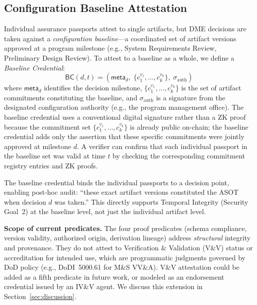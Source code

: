\subsection{Configuration Baseline Attestation}
\label{sec:fw-baseline}

Individual assurance passports attest to single artifacts, but DME decisions are taken against a \emph{configuration baseline}---a coordinated set of artifact versions approved at a program milestone (e.g., System Requirements Review, Preliminary Design Review).
To attest to a baseline as a whole, we define a \emph{Baseline Credential}:
\begin{equation}
\label{eq:baseline}
\mathsf{BC}(d, t) = \left(\mathsf{meta}_d,\; \{c_1^{v_1}, \ldots, c_k^{v_k}\},\; \sigma_{\text{auth}}\right)
\end{equation}
where $\mathsf{meta}_d$ identifies the decision milestone, $\{c_1^{v_1}, \ldots, c_k^{v_k}\}$ is the set of artifact commitments constituting the baseline, and $\sigma_{\text{auth}}$ is a signature from the designated configuration authority (e.g., the program management office).
The baseline credential uses a conventional digital signature rather than a ZK proof because the commitment set $\{c_1^{v_1}, \ldots, c_k^{v_k}\}$ is already public on-chain; the baseline credential adds only the assertion that these specific commitments were jointly approved at milestone $d$.
A verifier can confirm that each individual passport in the baseline set was valid at time $t$ by checking the corresponding commitment registry entries and ZK proofs.

The baseline credential binds the individual passports to a decision point, enabling post-hoc audit: ``these exact artifact versions constituted the ASOT when decision $d$ was taken.''
This directly supports Temporal Integrity (Security Goal~2) at the baseline level, not just the individual artifact level.

\textbf{Scope of current predicates.}
The four proof predicates (schema compliance, version validity, authorized origin, derivation lineage) address \emph{structural} integrity and provenance.
They do not attest to Verification \& Validation (V\&V) status or accreditation for intended use, which are programmatic judgments governed by DoD policy (e.g., DoDI~5000.61 for M\&S VV\&A).
V\&V attestation could be added as a fifth predicate in future work, or modeled as an endorsement credential issued by an IV\&V agent.
We discuss this extension in Section~\ref{sec:discussion}.

